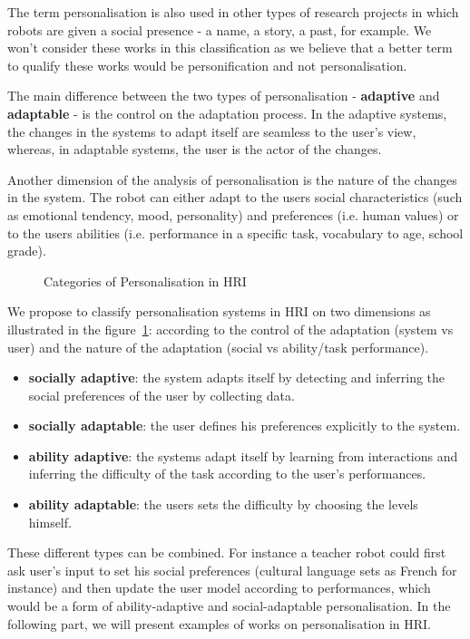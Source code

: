 \documentclass[smallextended]{svjour3}
\begin{document}
The term personalisation is also used in other types of research projects in which robots are given a social presence - a name, a story, a past, for example. 
We won't consider these works in this classification as we believe that a better term to qualify these works would be personification and not personalisation. 


The main difference between the two types of personalisation - \textbf{adaptive} and \textbf{adaptable} - is the control on the adaptation process. 
In the adaptive systems, the changes in the systems to adapt itself are seamless to the user's view, whereas, in adaptable systems, the user is the actor of the changes. 

Another dimension of the analysis of personalisation is the nature of the changes in the system. 
The robot can either adapt to the users social characteristics (such as emotional tendency, mood, personality) and preferences (i.e. human values) or to the users abilities (i.e. performance in a specific task, vocabulary to age, school grade).
\begin{figure}[h]
	\centering
	\caption{Categories of Personalisation in HRI}
	\label{fig:personalisation}
\end{figure}
We propose to classify personalisation systems in HRI on two dimensions as illustrated in the figure~\ref{fig:personalisation}: according to the control of the adaptation (system vs user) and the nature of the adaptation (social vs ability/task performance).

\begin{itemize}[noitemsep,nolistsep]
	\item \textbf{socially adaptive}: the system adapts itself by detecting and inferring the social preferences of the user by collecting data.
	\item \textbf{socially adaptable}: the user defines his preferences explicitly to the system. 
	\item \textbf{ability adaptive}: the systems adapt itself by learning from interactions and inferring the difficulty of the task according to the user's performances.
	\item \textbf{ability adaptable}: the users sets the difficulty by choosing the levels himself.
\end{itemize}
These different types can be combined.
For instance a teacher robot could first ask user's input to set his social preferences (cultural language sets as French for instance) and then update the user model according to performances, which would be a form of ability-adaptive and social-adaptable personalisation.
In the following part, we will present examples of works on personalisation in HRI. 
\end{document}
